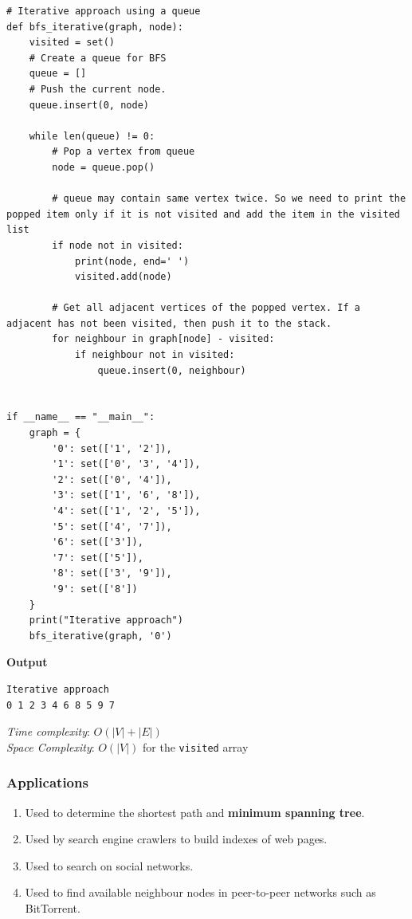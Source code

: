 \documentclass[a4paper,11pt]{book}
\begin{document}
\begin{lstlisting}
# Iterative approach using a queue
def bfs_iterative(graph, node):
    visited = set()
    # Create a queue for BFS
    queue = []
    # Push the current node.
    queue.insert(0, node)

    while len(queue) != 0:
        # Pop a vertex from queue
        node = queue.pop()

        # queue may contain same vertex twice. So we need to print the popped item only if it is not visited and add the item in the visited list
        if node not in visited:
            print(node, end=' ')
            visited.add(node)
            
        # Get all adjacent vertices of the popped vertex. If a adjacent has not been visited, then push it to the stack.
        for neighbour in graph[node] - visited:
            if neighbour not in visited:
                queue.insert(0, neighbour)
                
                
if __name__ == "__main__":
    graph = {
        '0': set(['1', '2']),
        '1': set(['0', '3', '4']),
        '2': set(['0', '4']),
        '3': set(['1', '6', '8']),
        '4': set(['1', '2', '5']),
        '5': set(['4', '7']),
        '6': set(['3']),
        '7': set(['5']),
        '8': set(['3', '9']),
        '9': set(['8'])
    }
    print("Iterative approach")
    bfs_iterative(graph, '0')
\end{lstlisting}
\textbf{Output}
\begin{lstlisting}
Iterative approach
0 1 2 3 4 6 8 5 9 7
\end{lstlisting}
\noindent \textit{Time complexity}: $O(|V| + |E|)$\\
\noindent \textit{Space Complexity}: $O(|V|)$ for the \lstinline{visited} array

\subsubsection{Applications}

\begin{enumerate}
    \item Used to determine the shortest path and \textbf{minimum spanning tree}.
\item Used by search engine crawlers to build indexes of web pages.
\item Used to search on social networks.
\item Used to find available neighbour nodes in peer-to-peer networks such as BitTorrent.
\end{enumerate}
\end{document}
